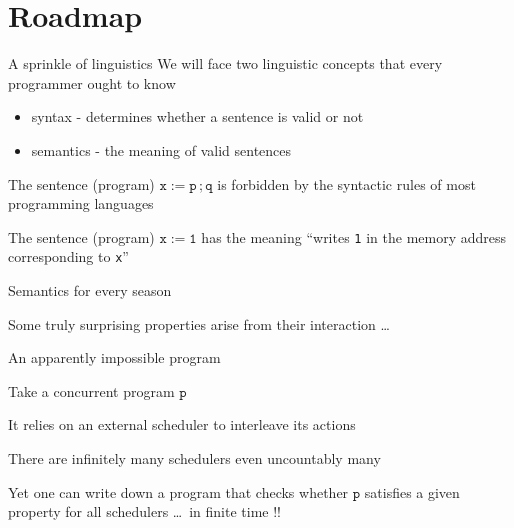 \documentclass{beamer}
\begin{document}
\section{Roadmap}

\begin{frame}{A sprinkle of linguistics}
  We will face two linguistic concepts that every programmer
  ought to know
  \begin{itemize}
  \item syntax - determines whether a sentence
    is valid or not
  \item semantics - the meaning of valid sentences
  \end{itemize}

  \vfill
  \begin{example}[syntax]
      The sentence (program) $\mathtt{x := p\, ;q}$ is forbidden by
      the syntactic rules of most programming languages
    \end{example}
  \begin{example}[semantics]
      The sentence (program) $\mathtt{x := 1}$ has the meaning ``writes
      \texttt{1} in the memory address corresponding to \texttt{x}''
  \end{example}
\end{frame}

\begin{frame}{Semantics for every season}

        \hspace*{+5pt}

        \vfill
        \pause
        Some truly surprising properties arise from their interaction \dots
\end{frame}

\begin{frame}{An apparently impossible program}

        Take a concurrent program $\mathtt{p}$

        It relies on an external scheduler to interleave its actions

        There are infinitely many schedulers even \alert{uncountably} many

        Yet one can write down a program that checks whether $\mathtt{p}$
        satisfies a given property \alert{for all} schedulers \dots\ in \alert{finite}
        time !!
\end{frame}
\end{document}
